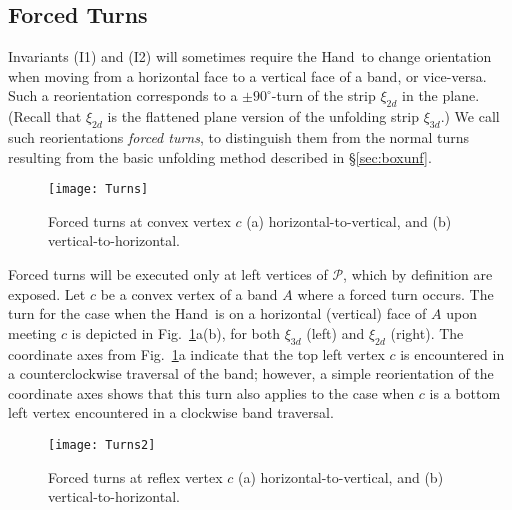 \documentclass[11pt]{article}
\def\P{{\mathcal P}}
\newcommand\hand{{\sc Hand}}
\begin{document}
\subsection{Forced Turns}
\label{sec:forcedturns}
Invariants (I1) and (I2) will sometimes require the \hand\ to change orientation when moving from a horizontal face to a vertical face of a band, or vice-versa. Such a reorientation corresponds to a $\pm 90^\circ$-turn of the strip $\xi_{2d}$ in the plane. (Recall that $\xi_{2d}$ is the flattened plane version of the unfolding strip $\xi_{3d}$.) We call such reorientations \emph{forced turns}, to distinguish them from the normal turns resulting from the basic unfolding method described in \S\ref{sec:boxunf}.

\begin{figure}[htbp]
\centering
\texttt{[image: Turns]}
\caption{Forced turns at convex vertex $c$ (a) horizontal-to-vertical, and  (b) vertical-to-horizontal.}
\label{fig:turns}
\end{figure}


Forced turns will be executed only at left vertices of $\P$, which by definition are exposed. Let $c$ be a convex vertex of a band $A$ where a forced turn occurs. The turn for the case when the \hand\ is on a horizontal (vertical) face of $A$ upon meeting $c$ is depicted in Fig.~\ref{fig:turns}a(b), for both $\xi_{3d}$ (left) and $\xi_{2d}$ (right). The coordinate axes from Fig.~\ref{fig:turns}a indicate that the top left vertex $c$ is encountered in a counterclockwise traversal of the band; however, a simple reorientation of the coordinate axes shows that this turn also applies to the case when $c$ is a  bottom left vertex encountered in a clockwise band traversal. 

\begin{figure}[htbp]
\centering
\texttt{[image: Turns2]}
\caption{Forced turns at reflex vertex $c$ (a) horizontal-to-vertical, and  (b) vertical-to-horizontal.}
\label{fig:turns2}
\end{figure}
\end{document}
